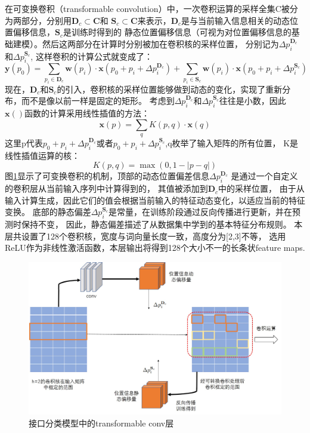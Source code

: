 在可变换卷积（transformable convolution）中，一次卷积运算的采样全集C被分为两部分，分别用$\mathbf{D}_{c} \subset \mathbf{C}$和
$\mathbf{S}_{c} \subset \mathbf{C}$来表示，$\mathbf{D}_{c}$是与当前输入信息相关的动态位置偏移信息，$\mathbf{S}_{c}$是训练时得到的
静态位置偏移信息（可视为对位置偏移信息的基础建模）。然后这两部分在计算时分别被加在卷积核的采样位置，
分别记为$\Delta p_{i}^{\mathbf{D}_{c}}$和$\Delta p_{i}^{\mathbf{S}_{c}}$,
这样卷积的计算公式就变成了：
\begin{equation}
  \mathbf{y}\left(p_{0}\right)= \sum_{p_{i} \in \mathbf{D}_{c}} \mathbf{w}\left(p_{i}\right) \cdot \mathbf{x}\left(p_{0}+p_{i}+\Delta p_{i}^{\mathbf{D}_{c}}\right) +\sum_{p_{i} \in \mathbf{S}_{c}} \mathbf{w}\left(p_{i}\right) \cdot \mathbf{x}\left(p_{0}+p_{i}+\Delta p_{i}^{\mathbf{S}_{c}}\right)
\end{equation}
现在，$\mathbf{D}_{c}$和$\mathbf{S}_{c}$的引入，卷积核的采样位置能够做到动态的变化，实现了重新分布，而不是像以前一样是固定的矩形。
考虑到$\Delta p_{i}^{\mathbf{D}_{c}}$和$\Delta p_{i}^{\mathbf{S}_{c}}$往往是小数，因此$\mathbf{x}()$函数的计算采用线性插值的方法：
\begin{equation}
\mathbf{x}(p)=\sum_{q} K(p, q) \cdot \mathbf{x}(q)
\end{equation}
这里p代表$p_{0}+p_{i}+\Delta p_{i}^{\mathbf{D}_{c}}$或者$p_{0}+p_{i}+\Delta p_{i}^{\mathbf{S}_{c}}$,q枚举了输入矩阵的所有位置，
K是线性插值运算的核：
\begin{equation}
K(p, q)=\max (0,1-|p-q|)
\end{equation}
图\ref{fig:tansconv}显示了可变换卷积的机制，顶部的动态位置偏差信息$\Delta p_{i}^{\mathbf{D}_{c}}$
是通过一个自定义的卷积层从当前输入序列中计算得到的，
其值被添加到$\mathbf{D}_{c}$中的采样位置，
由于从输入计算生成，因此它们的值会根据当前输入的特征动态变化，以适应当前的特征变换。 
底部的静态偏差$\Delta p_{i}^{\mathbf{S}_{c}}$是常量，在训练阶段通过反向传播进行更新，并在预测时保持不变，
因此，静态偏差描述了从数据集中学到的基本特征分布规则。
本层共设置了128个卷积核，宽度与词向量长度一致，高度分为[2,3]不等，
选用ReLU作为非线性激活函数，本层输出将得到128个大小不一的长条状feature maps.

\begin{figure}[htbp]
  \centering
  \includegraphics[scale=0.4]{./images/tansconv.jpg}
  \caption{接口分类模型中的transformable conv层}
  \label{fig:tansconv}
\end{figure}

